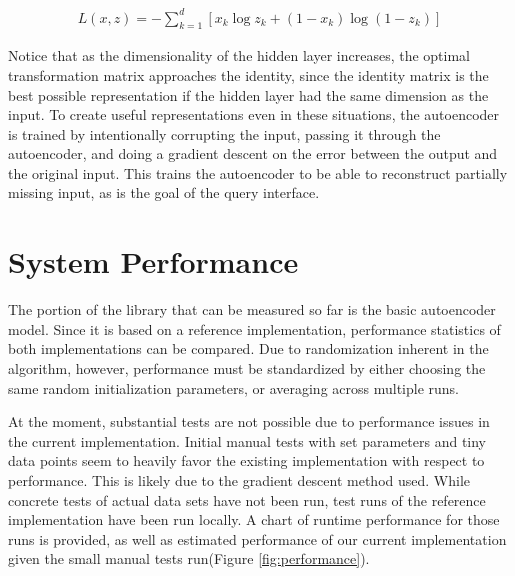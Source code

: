 \documentclass{sig-alternate}
\begin{document}
\begin{gather}
L(x,z) = -\sum_{k=1}^d [x_k \log z_k + (1-x_k) \log( 1-z_k)]
\end{gather}

Notice that as the dimensionality
of the hidden layer increases, the optimal transformation matrix approaches the identity, since
the identity matrix is the best possible representation if the hidden layer had the same dimension
as the input. To create useful representations even in these situations, the autoencoder is trained
by intentionally corrupting the input, passing it through the autoencoder, and doing a gradient
descent on the error between the output and the original input. This trains the autoencoder
to be able to reconstruct partially missing input, as is the goal of the query interface.

\section{System Performance}
\label{sec:sysperformance}

The portion of the library that can be measured so far is the basic autoencoder model. 
Since it is based on a reference implementation, performance statistics of both
implementations can be compared. Due to randomization inherent in the algorithm, however, 
performance must be standardized by either choosing the same random initialization parameters, or 
averaging across multiple runs. 

At the moment, substantial tests are not possible due to performance issues in the current 
implementation. Initial manual tests with set parameters and tiny data points seem to heavily favor 
the existing implementation with respect to performance. This is likely due to the gradient descent
method used. While concrete tests of actual data sets have not 
been run, test runs of the reference implementation have been run locally. A chart of runtime
performance for those runs is provided, as well as estimated performance of our current 
implementation given the small manual tests run(Figure \ref{fig:performance}). 
\end{document}
